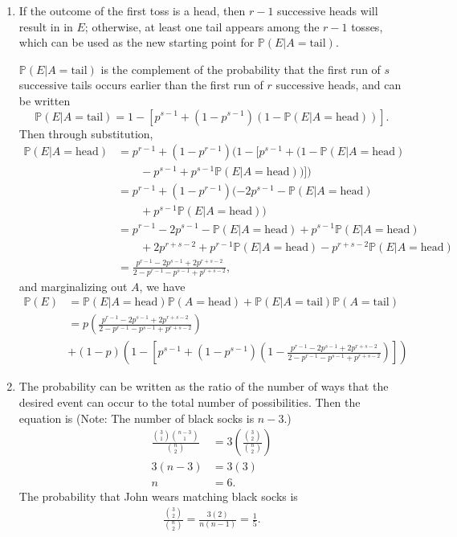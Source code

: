 \documentclass[a4paper,12pt]{article}
\begin{document}
\begin{enumerate}
	\item If the outcome of the first toss is a head, then $r - 1$ successive heads will result in in $E$; otherwise, at least one tail appears among the $r - 1$ tosses, which can be used as the new starting point for $\mathbb{P}(E | A = \mbox{tail})$. \par
	$\mathbb{P}(E | A = \mbox{tail})$ is the complement of the probability that the first run of $s$ successive tails occurs earlier than the first run of $r$ successive heads, and can be written
	\[
		\mathbb{P}(E | A = \mbox{tail}) = 1 - [p^{s - 1} + (1 - p^{s - 1})(1 - \mathbb{P}(E | A = \mbox{head}))].
	\]
	Then through substitution,
	\begin{align*}
		\mathbb{P}(E | A = \mbox{head}) &= p^{r - 1} + (1 - p^{r - 1}) (1 - [p^{s - 1} + (1 - \mathbb{P}(E | A = \mbox{head}) \\
		&\qquad - p^{s - 1} + p^{s - 1}\mathbb{P}(E | A = \mbox{head}))]) \\
		&= p^{r - 1} + (1 - p^{r - 1})(-2p^{s - 1} - \mathbb{P}(E | A = \mbox{head}) \\
		&\qquad + p^{s - 1} \mathbb{P}(E | A = \mbox{head})) \\
		&= p^{r - 1} - 2p^{s - 1} - \mathbb{P}(E | A = \mbox{head}) + p^{s - 1} \mathbb{P}(E | A = \mbox{head}) \\
		&\qquad + 2p^{r + s - 2} + p^{r - 1} \mathbb{P}(E | A = \mbox{head}) - p^{r + s - 2} \mathbb{P}(E | A = \mbox{head}) \\
		&= \frac{p^{r - 1} - 2p^{s - 1} + 2p^{r + s - 2}}{2 - p^{r - 1} - p^{s - 1} + p^{r + s - 2}},
	\end{align*}
	and marginalizing out $A$, we have
	\begin{align*}
        \mathbb{P}(E) &= \mathbb{P}(E | A = \mbox{head}) \mathbb{P}(A = \mbox{head}) + \mathbb{P}(E | A = \mbox{tail}) \mathbb{P}(A = \mbox{tail}) \\
        &= p \left( \frac{p^{r - 1} - 2p^{s - 1} + 2p^{r + s - 2}}{2 - p^{r - 1} - p^{s - 1} + p^{r + s - 2}} \right) \\
        &+ (1 - p) \left( 1 - [p^{s - 1} + (1 - p^{s - 1})(1 - \frac{p^{r - 1} - 2p^{s - 1} + 2p^{r + s - 2}}{2 - p^{r - 1} - p^{s - 1} + p^{r + s - 2}})] \right)
	\end{align*}

	\setcounter{enumi}{18}
	\item The probability can be written as the ratio of the number of ways that the desired event can occur to the total number of possibilities. Then the equation is (Note: The number of black socks is $n - 3$.)
	\begin{align*}
		\frac{\binom{3}{1} \binom{n - 3}{1}}{\binom{n}{2}} &= 3 \left( \frac{\binom{3}{2}}{\binom{n}{2}} \right) \\
		3(n - 3) &= 3(3) \\
		n &= 6.
	\end{align*}
	The probability that John wears matching black socks is
	\begin{align*}
		\frac{\binom{3}{2}}{\binom{n}{2}} = \frac{3(2)}{n(n - 1)} = \frac{1}{5}.
	\end{align*}

\end{enumerate}
\end{document}
